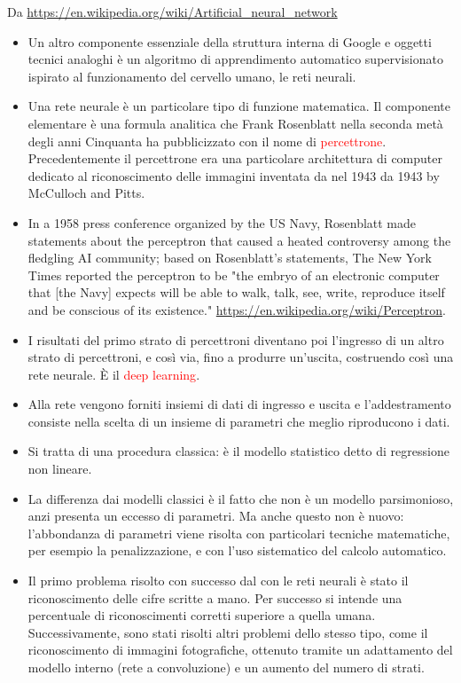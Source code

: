 \documentclass[xcolor=svgnames]{beamer}
\newcommand{\rosso}[1]{\textcolor{red}{#1}}
\renewcommand{\emph}{\rosso}
\begin{document}
\begin{frame}
  {\tiny Da \url{https://en.wikipedia.org/wiki/Artificial_neural_network}}
  \begin{itemize}
    \item 
      Un altro componente essenziale della struttura interna di Google e oggetti tecnici analoghi è un algoritmo di apprendimento automatico supervisionato ispirato al funzionamento del cervello umano, le reti neurali.
    \item Una rete neurale è un particolare tipo di funzione matematica. Il componente elementare è una formula analitica che Frank Rosenblatt nella seconda metà degli anni Cinquanta ha pubblicizzato con il nome di \emph{percettrone}. Precedentemente il percettrone era una particolare architettura di computer dedicato al riconoscimento delle immagini inventata da nel 1943 da 1943 by McCulloch and Pitts.
\item In a 1958 press conference organized by the US Navy, Rosenblatt made statements about the perceptron that caused a heated controversy among the fledgling AI community; based on Rosenblatt's statements, The New York Times reported the perceptron to be "the embryo of an electronic computer that [the Navy] expects will be able to walk, talk, see, write, reproduce itself and be conscious of its existence." {\tiny \url{https://en.wikipedia.org/wiki/Perceptron}}.
    \item I risultati del primo strato di percettroni diventano poi l'ingresso di un altro strato di percettroni, e così via, fino a produrre un'uscita, costruendo così una rete neurale. \`E il \emph{deep learning}.
      \item Alla rete vengono forniti insiemi di dati di ingresso e uscita e l'addestramento consiste nella scelta di un insieme di parametri che meglio riproducono i dati.
\item Si tratta di una procedura classica: è il modello statistico detto di regressione non lineare.
  \item La differenza dai modelli classici è il fatto che non è un modello parsimonioso, anzi presenta un eccesso di parametri. Ma anche questo non è nuovo: l'abbondanza di parametri viene risolta con particolari tecniche matematiche, per esempio la penalizzazione, e con l'uso sistematico del calcolo automatico.
\item 
  Il primo problema risolto con successo dal con le reti neurali è stato il riconoscimento delle cifre scritte a mano. Per successo si intende una percentuale di riconoscimenti corretti superiore a quella umana. Successivamente, sono stati risolti altri problemi dello stesso tipo, come il riconoscimento di immagini fotografiche, ottenuto tramite un adattamento del modello interno (rete a convoluzione) e un aumento del numero di strati.
\end{itemize}

\end{frame}
\end{document}

